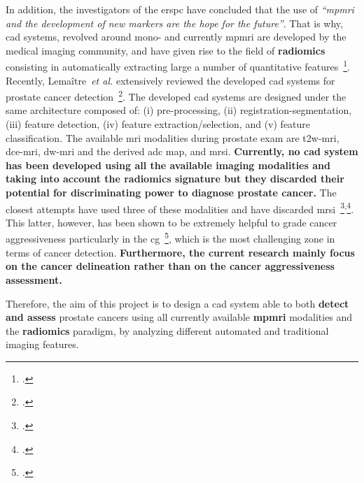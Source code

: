 In addition, the investigators of the \ac{erspc} have concluded that the use of \emph{``\ac{mpmri} and the development of new markers are the hope for the future''}.
That is why, \ac{cad} systems, revolved around mono- and currently \ac{mpmri} are developed by the medical imaging community, and have given rise to the field of \textbf{radiomics} consisting in automatically extracting large a number of quantitative features~\footcite{lambin2012radiomics}.
Recently, Lema\^itre~\emph{et al.} extensively reviewed the developed \ac{cad} systems for prostate cancer detection~\footcite{Lemaitre2015}.
The developed \ac{cad} systems are designed under the same architecture composed of: (i) pre-processing, (ii) registration-segmentation, (iii) feature detection, (iv) feature extraction/selection, and (v) feature classification.
The available \ac{mri} modalities during prostate exam are \ac{t2w}-\ac{mri}, \ac{dce}-\ac{mri}, \ac{dw}-\ac{mri} and the derived \ac{adc} map, and \ac{mrsi}. 
\textbf{Currently, no \ac{cad} system has been developed using all the available imaging modalities and taking into account the radiomics signature but they discarded their potential for discriminating power to diagnose prostate cancer.}
The closest attempts have used three of these modalities and have discarded \ac{mrsi}~\footcite{Litjens2014}\textsuperscript{,}\footcite{Viswanath2011}.
This latter, however, has been shown to be extremely helpful to grade cancer aggressiveness particularly in the \ac{cg}~\footcite{Vos2015}, which is the most challenging zone in terms of cancer detection.
\textbf{Furthermore, the current research mainly focus on the cancer delineation rather than on the cancer aggressiveness assessment.}

% 

Therefore, the aim of this project is to design a \ac{cad} system able to both \textbf{detect and assess} prostate cancers using all currently available \textbf{\ac{mpmri}} modalities and the \textbf{radiomics} paradigm, by analyzing different automated and traditional imaging features.


